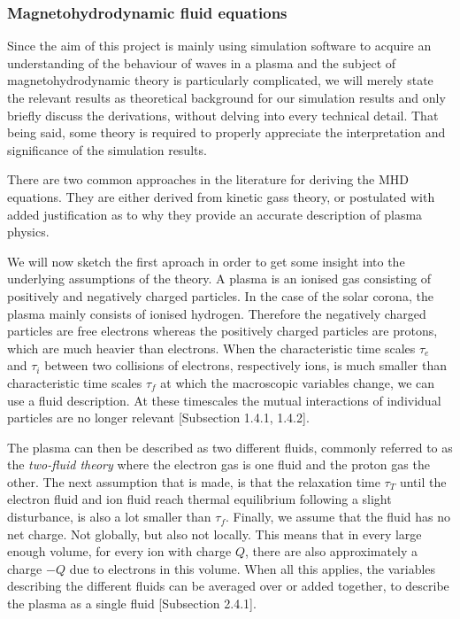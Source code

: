 \subsubsection{Magnetohydrodynamic fluid equations}
Since the aim of this project is mainly using simulation software to acquire an understanding of the behaviour of waves in a plasma and the subject of magnetohydrodynamic theory is particularly complicated,
we will merely state the relevant results as theoretical background for our simulation results and only briefly discuss the derivations, without delving into every technical detail.
That being said, some theory is required to properly appreciate the interpretation and significance of the simulation results.

There are two common approaches in the literature for deriving the MHD equations. They are either derived from kinetic gass theory, or postulated with added justification as to why they provide an accurate description of plasma physics.

We will now sketch the first aproach in order to get some insight into the underlying assumptions of the theory.
A plasma is an ionised gas consisting of positively and negatively charged particles. In the case of the solar corona, the plasma mainly consists of ionised hydrogen.
Therefore the negatively charged particles are free electrons whereas the positively charged particles are protons, which are much heavier than electrons.
When the characteristic time scales $\tau_e$ and $\tau_i$ between two collisions of electrons, respectively ions, is much smaller than characteristic time scales $\tau_f$ at which the macroscopic variables change, we can use a fluid description. 
At these timescales the mutual interactions of individual particles are no longer relevant \cite{notes-principles-MHD}[Subsection 1.4.1, 1.4.2].

The plasma can then be described as two different fluids, commonly referred to as the \emph{two-fluid theory} where the electron gas is one fluid and the proton gas the other. 
The next assumption that is made, is that the relaxation time $\tau_T$ until the electron fluid and ion fluid reach thermal equilibrium following a slight disturbance, is also a lot smaller than $\tau_f$.
Finally, we assume that the fluid has no net charge. Not globally, but also not locally. 
This means that in every large enough volume, for every ion with charge $Q$, there are also approximately a charge $-Q$ due to electrons in this volume. When all this applies, the variables describing the different fluids can be averaged over or added together, to describe the plasma as a single fluid \cite{notes-principles-MHD}[Subsection 2.4.1].

